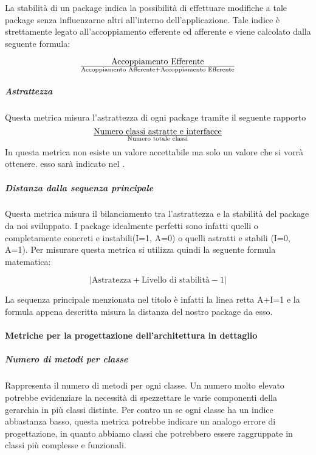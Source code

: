La stabilità di un package indica la possibilità di effettuare modifiche a tale package senza influenzarne altri all'interno dell'applicazione. Tale indice è strettamente legato all'accoppiamento efferente ed afferente e viene calcolato dalla seguente formula:

\begin{displaymath}
{\text{Accoppiamento Efferente}}\over{\text{Accoppiamento Afferente} + \text{Accoppiamento Efferente}}
\end{displaymath}

\subparagraph{Astrattezza}
Questa metrica misura l'astrattezza di ogni package tramite il seguente rapporto 
\begin{displaymath}
{\text{Numero classi astratte e interfacce}}\over{\text{Numero totale classi}}
\end{displaymath}
In questa metrica non esiste un valore accettabile ma solo un valore che si vorrà ottenere. esso sarà indicato nel \pianodiqualifica.

\subparagraph{Distanza dalla sequenza principale}
Questa metrica misura il bilanciamento tra l'astrattezza e la stabilità del package da noi sviluppato. I package idealmente perfetti sono infatti quelli o completamente concreti e instabili(I=1, A=0) o quelli astratti e stabili (I=0, A=1). Per misurare questa metrica si utilizza quindi la seguente formula matematica:

\begin{displaymath}
{|\text{Astratezza} + \text{Livello di stabilità} - 1|}
\end{displaymath}

La sequenza principale menzionata nel titolo è infatti la linea retta A+I=1 e la formula appena descritta misura la distanza del nostro package da esso.

\paragraph{Metriche per la progettazione dell'architettura in dettaglio}

\subparagraph{Numero di metodi per classe}
Rappresenta il numero di metodi per ogni classe.
Un numero molto elevato potrebbe evidenziare la necessità di spezzettare le varie componenti della gerarchia in più classi distinte.
Per contro un se ogni classe ha un indice abbastanza basso, questa metrica potrebbe indicare un analogo errore di progettazione, in quanto abbiamo classi che potrebbero essere raggruppate in classi più complesse e funzionali.

